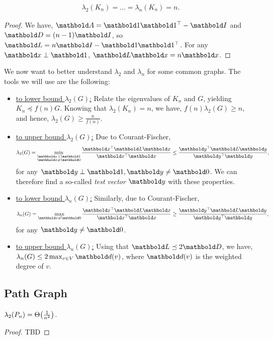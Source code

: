 \begin{lem} \begin{align}
    \lambda_2(K_n) = \dots = \lambda_n(K_n) = n.
\end{align}
\end{lem}
\begin{proof} We have, $\mA = \vOne\trans{\vOne} - \mI$ and $\mD = (n-1)\mI$, so $\mL = n\mI - \vOne\trans{\vOne}$. For any $\vx \perp \vOne$, $\mL\vx = n\vx$.
\end{proof}

We now want to better understand $\lambda_2$ and $\lambda_n$ for some common graphs. The tools we will use are the following: \begin{itemize}
    \item \underline{to lower bound $\lambda_2(G)$:} Relate the eigenvalues of $K_n$ and $G$, yielding $K_n \preceq f(n) G$. Knowing that $\lambda_2(K_n) = n$, we have, $f(n) \lambda_2(G) \geq n$, and hence, $\lambda_2(G) \geq \frac{n}{f(n)}$.
    \item \underline{to upper bound $\lambda_2(G)$:} Due to Courant-Fischer, \begin{align*}
        \lambda_2(G) = \min_{\substack{\vx \perp \vOne \\ \vx \neq \vZero}} \frac{\trans{\vx}\mL\vx}{\trans{\vx}\vx} \leq \frac{\trans{\vy}\mL\vy}{\trans{\vy}\vy},
    \end{align*} for any $\vy \perp \vOne, \vy \neq \vZero$. We can therefore find a so-called \emph{test vector} $\vy$ with these properties.
    \item \underline{to lower bound $\lambda_n(G)$:} Similarly, due to Courant-Fischer, \begin{align*}
        \lambda_n(G) = \max_{\vx \neq \vZero} \frac{\trans{\vx}\mL\vx}{\trans{\vx}\vx} \geq \frac{\trans{\vy}\mL\vy}{\trans{\vy}\vy},
    \end{align*} for any $\vy \neq \vZero$.
    \item \underline{to upper bound $\lambda_n(G)$:} Using that $\mL \preceq 2 \mD$, we have, $\lambda_n(G) \leq 2 \max_{v \in \sV} \vd(v)$, where $\vd(v)$ is the weighted degree of $v$.
\end{itemize}

\subsection{Path Graph}

\begin{lem} $\lambda_2(P_n) = \Theta\parentheses*{\frac{1}{n^2}}$.
\end{lem}
\begin{proof}
TBD
\end{proof}

